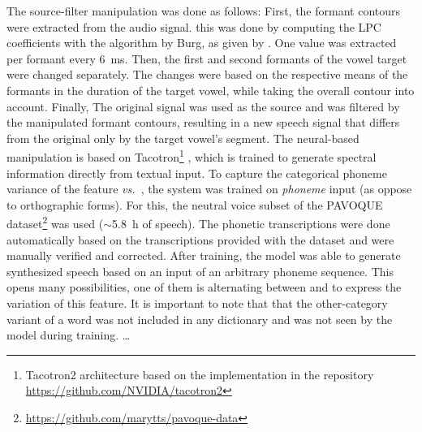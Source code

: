 The source-filter manipulation was done as follows:
First, the formant contours were extracted from the audio signal.
this was done by computing the LPC coefficients with the algorithm by Burg, as given by .
One value was extracted per formant every \SI{6}{\milli\second}.
Then, the first and second formants of the vowel target were changed separately.
The changes were based on the respective means of the formants in the duration of the target vowel, while taking the overall contour into account.
Finally, The original signal was used as the source and was filtered by the manipulated formant contours, resulting in a new speech signal that differs from the original only by the target vowel's segment.
The neural-based manipulation is based on Tacotron\footnote{Tacotron2 architecture based on the implementation in the repository \url{https://github.com/NVIDIA/tacotron2}} \citep{Shen2018natural}, which is trained to generate spectral information directly from textual input.
To capture the categorical phoneme variance of the feature \emph{\textipa{[\c{c}]} vs.\ \textipa{[k]}}, the system was trained on \emph{phoneme} input (as oppose to orthographic forms).
For this, the neutral voice subset of the PAVOQUE dataset\footnote{\url{https://github.com/marytts/pavoque-data}} \citep{Steiner2013pavoque} was used ($\sim$\SI{5.8}{\hour} of speech).
The phonetic transcriptions were done automatically based on the transcriptions provided with the dataset and were manually verified and corrected.
After training, the model was able to generate synthesized speech based on an input of an arbitrary phoneme sequence.
This opens many possibilities, one of them is alternating between \textipa{[\c{c}]} and \textipa{[k]} to express the variation of this feature.
It is important to note that that the other-category variant of a word was not included in any dictionary and was not seen by the model during training.
\ldots
%
